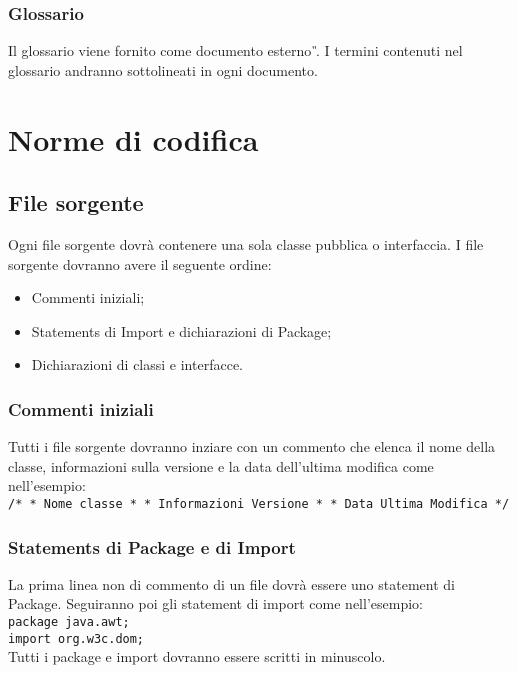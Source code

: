 \subsection{Glossario}
Il glossario viene fornito come documento esterno \textit{\G}. I termini contenuti nel glossario andranno sottolineati in ogni documento.

\chapter{Norme di codifica}
\section{File sorgente}
Ogni file sorgente dovr\`a contenere una sola classe pubblica o interfaccia. I file sorgente dovranno avere il seguente ordine:
\begin{itemize}
\item Commenti iniziali;
\item Statements di Import e dichiarazioni di Package;
\item Dichiarazioni di classi e interfacce.
\end{itemize}
\subsection{Commenti iniziali}
Tutti i file sorgente dovranno inziare con un commento che elenca il nome della classe, informazioni sulla versione e la data dell'ultima modifica come nell'esempio: \\
 \newline
\texttt{/* \newline
* Nome classe \newline
* \newline
* Informazioni Versione \newline
* \newline
* Data Ultima Modifica \newline
*/ \\}
 \newline
\subsection{Statements di Package e di Import}
La prima linea non di commento di un file dovr\`a essere uno statement di Package. Seguiranno poi gli statement di import come nell'esempio: \\
 \newline
\texttt{package java.awt; \\ 
import org.w3c.dom; \\}
Tutti i package e import dovranno essere scritti in minuscolo.
